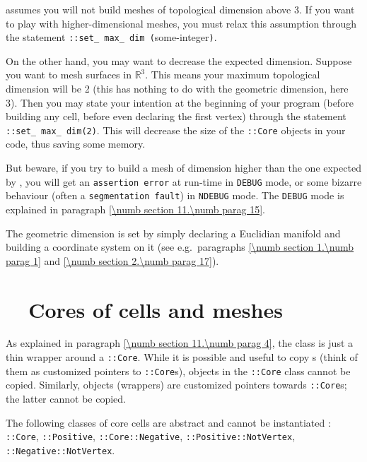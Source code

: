 \leavevmode {\ManiFEM} assumes you will not build meshes of topological dimension
above 3.
If you want to play with higher-dimensional meshes, you must relax this assumption
through the statement {\small\tt {}::set\_\,max\_\,dim (}some-integer{\small\tt )}.

On the other hand, you may want to decrease the expected dimension.
Suppose you want to mesh surfaces in $ \mathbb{R}^3 $.
This means your maximum topological dimension will be 2
(this has nothing to do with the geometric dimension, here 3).
Then you may state your intention at the beginning of your program
(before building any cell, before even declaring the first vertex) through
the statement {\small\tt {}::set\_\,max\_\,dim(2)}.
This will decrease the size of the {\small\tt {}::Core} objects in your code,
thus saving some memory.

But beware, if you try to build a mesh of dimension higher than the one expected by
\maniFEM, you will get an {\small\tt assertion error} at run-time in {\small\tt DEBUG} mode,
or some bizarre behaviour (often a {\small\tt segmentation fault}) in {\small\tt NDEBUG} mode.
The {\small\tt DEBUG} mode is explained in paragraph \ref{\numb section 11.\numb parag 15}.

The geometric dimension is set by simply declaring a Euclidian manifold and building
a coordinate system on it (see e.g.\ paragraphs \ref{\numb section 1.\numb parag 1}
and \ref{\numb section 2.\numb parag 17}).


\section{~~Cores of cells and meshes}\label{\numb section 11.\numb parag 8}

As explained in paragraph \ref{\numb section 11.\numb parag 4}, the {\small\tt {}}
class is just a thin wrapper around a {\small\tt {}::Core}.
While it is possible and useful to copy {\small\tt {}}s (think of them as customized
pointers to {\small\tt {}::Core}s), objects in the {\small\tt {}::Core}
class cannot be copied.
Similarly, {\small\tt {}} objects (wrappers) are customized pointers towards
{\small\tt {}::Core}s; the latter cannot be copied.

The following classes of core cells are abstract and cannot be instantiated :
{\small\tt {}::Core}, {\small\tt {}::Positive},
{\small\tt {}::Core::Negative}, {\small\tt {}::Positive::NotVertex},
{\small\tt {}::Negative::NotVertex}.


